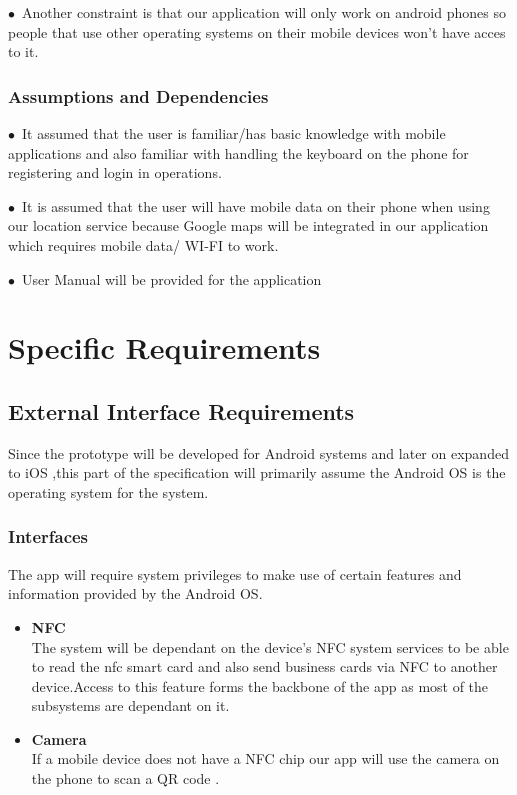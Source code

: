 \documentclass[english]{article}
\begin{document}
                                	$\bullet$\  Another constraint is that our application will only work on android phones so people that use other operating systems on their mobile devices won't have acces to it.  
				
				\subsubsection{Assumptions and Dependencies}
				
				 $\bullet$\ It assumed that the user is familiar/has basic knowledge with mobile applications  and also familiar with handling the keyboard on the phone for registering and login in operations.

                                 	 $\bullet$\ It is assumed that the user will have mobile data on their phone when using our location service because Google maps will be integrated in our application which requires mobile data/ WI-FI to work.

                                	 $\bullet$\ User Manual will be provided for the application 
		
		\newpage

	\section{Specific Requirements}
				\subsection{External Interface Requirements}
						Since the prototype will  be developed for Android systems and later on expanded to iOS ,this part of the specification will primarily assume the Android OS is the operating system for the system.
						\subsubsection{Interfaces} 
					         The app will require system privileges to make use of certain features and information provided by the Android OS.
						 \begin{itemize}
							      \item \textbf{NFC}\\
					        The system will be dependant on the device's NFC system services to be able to read the nfc smart card and also send                              business cards via NFC to another device.Access to this feature forms the backbone of the app as most of the subsystems are dependant on it.
								\item \textbf{Camera}\\
						If a mobile device does not have a NFC chip our app will use the camera on the phone to scan a QR code .
						\end{itemize}
\end{document}
